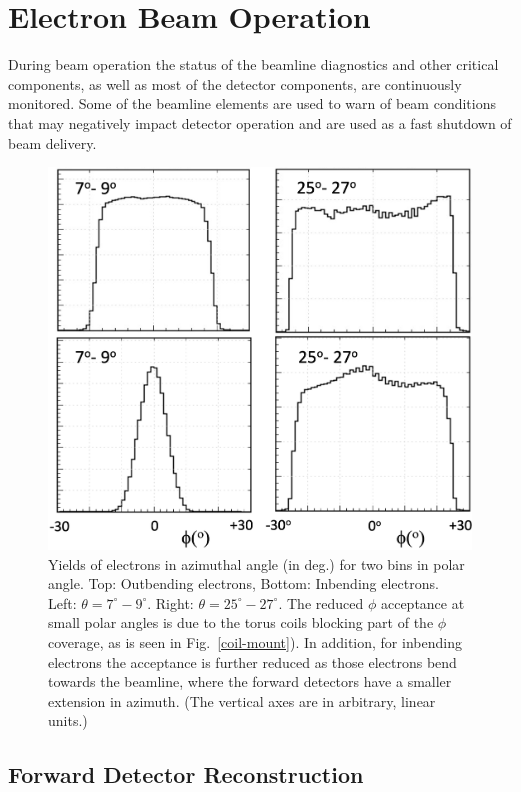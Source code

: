 \documentclass[final,3p,twocolumn]{elsarticle}
\begin{document}
\section{Electron Beam Operation} 

During beam operation the status of the beamline diagnostics and other critical components, as well as most of the 
detector components, are continuously monitored. Some of the beamline elements are used to warn of beam conditions
that may negatively impact detector operation and are used as a fast shutdown of beam delivery.    

\begin{figure}[t!]
\centerline{\includegraphics[width=1.0\columnwidth]{e1_R1_phi-out-in.png}}
\caption{Yields of electrons in azimuthal angle (in deg.) for two bins in polar angle. Top: Outbending electrons, Bottom:
  Inbending electrons. Left: $\theta = 7^\circ-9^\circ$. Right: $\theta = 25^\circ-27^\circ$. The reduced $\phi$
  acceptance at small polar angles is due to the torus coils blocking part of the $\phi$ coverage, as is seen in
  Fig.~\ref{coil-mount}). In addition, for inbending electrons the acceptance is further reduced as those electrons
  bend towards the beamline, where the forward detectors have a smaller extension in azimuth. (The vertical axes are
  in arbitrary, linear units.)}
\label{e-accept-in}
\end{figure}

\subsection{Forward Detector Reconstruction} 
\end{document}
